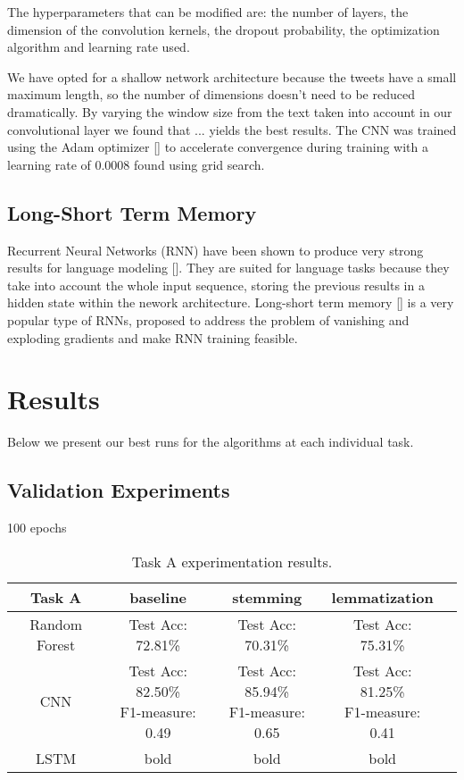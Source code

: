 \documentclass[11pt,a4paper]{article}
\begin{document}
The hyperparameters that can be modified are: the number of layers, the dimension of the convolution kernels, the dropout probability, the optimization algorithm and learning rate used.

We have opted for a shallow network architecture because the tweets have a small maximum length, so the number of dimensions doesn't need to be reduced dramatically. By varying the window size from the text taken into account in our convolutional layer we found that ... yields the best results. The CNN was trained using the Adam optimizer [] to accelerate convergence during training with a learning rate of 0.0008 found using grid search.

\subsection{Long-Short Term Memory}

Recurrent Neural Networks (RNN) have been shown to produce very strong results for language modeling []. 
They are suited for language tasks because they take into account the whole input sequence, storing the previous results in a hidden state within the nework architecture. Long-short term memory [] is a very popular type of RNNs, proposed to address the problem of vanishing and exploding gradients and make RNN training feasible.

\section{Results}

Below we present our best runs for the algorithms at each individual task.

\subsection{Validation Experiments}

100 epochs

\begin{table*}[t]
\begin{center}
\begin{tabular}{|c|cccc|}
\hline \bf Task A & \bf baseline & \bf stemming & \bf lemmatization & \\ \hline
Random Forest & Test Acc: 72.81\% & Test Acc: 70.31\% & Test Acc: 75.31\% & \\ \hline
CNN & \shortstack{Test Acc: 82.50\% \\ F1-measure: 0.49}  & \shortstack{Test Acc: 85.94\% \\ F1-measure: 0.65} & \shortstack{Test Acc: 81.25\% \\ F1-measure: 0.41} & \\ \hline
LSTM & bold & bold & bold & \\
\hline
\end{tabular}
\end{center}
\caption{\label{font-table} Task A experimentation results. }
\end{table*}
\end{document}
